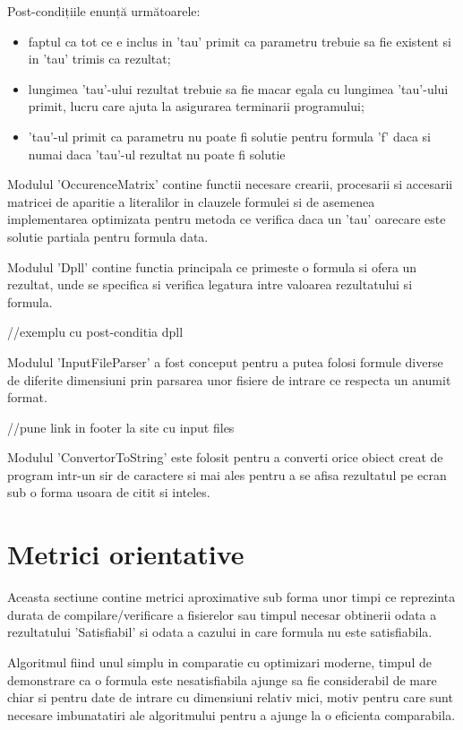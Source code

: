{Post-condițiile enunță următoarele: 
\begin{itemize}
	\item  faptul ca tot ce e inclus in 'tau' primit ca parametru trebuie sa fie existent si in 'tau' trimis ca rezultat; 
	
	\item lungimea 'tau'-ului rezultat trebuie sa fie macar egala cu lungimea 'tau'-ului primit, lucru care ajuta la asigurarea terminarii programului;
	
	\item 'tau'-ul primit ca parametru nu poate fi solutie pentru formula 'f' daca si numai daca 'tau'-ul rezultat nu poate fi solutie
\end{itemize}

Modulul 'OccurenceMatrix' contine functii necesare crearii, procesarii si accesarii matricei de aparitie a literalilor in clauzele formulei si de asemenea implementarea optimizata pentru metoda ce verifica daca un 'tau' oarecare este solutie partiala pentru formula data.

Modulul 'Dpll' contine functia principala ce primeste o formula si ofera un rezultat, unde se specifica si verifica legatura intre valoarea rezultatului si formula.

//exemplu cu post-conditia dpll

Modulul 'InputFileParser' a fost conceput pentru a putea folosi formule diverse de diferite dimensiuni prin parsarea unor fisiere de intrare ce respecta un anumit format.

//pune link in footer la site cu input files

 Modulul 'ConvertorToString' este folosit pentru a converti orice obiect creat de program intr-un sir de caractere si mai ales pentru a se afisa rezultatul pe ecran sub o forma usoara de citit si inteles.






\section{Metrici orientative}

Aceasta sectiune contine metrici aproximative sub forma unor timpi ce reprezinta durata de compilare/verificare a fisierelor sau timpul necesar obtinerii odata a rezultatului 'Satisfiabil' si odata a cazului in care formula nu este satisfiabila.


Algoritmul fiind unul simplu in comparatie cu optimizari moderne, timpul de demonstrare ca o formula este nesatisfiabila ajunge sa fie considerabil de mare chiar si pentru date de intrare cu dimensiuni relativ mici, motiv pentru care sunt necesare imbunatatiri ale algoritmului pentru a ajunge la o eficienta comparabila.

}
